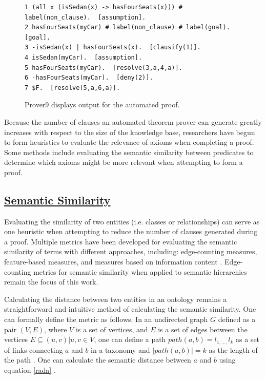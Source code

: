 \documentclass{article}
\begin{document}
\begin{figure}[h]
\begin{verbatim}
1 (all x (isSedan(x) -> hasFourSeats(x))) # label(non_clause).  [assumption].
2 hasFourSeats(myCar) # label(non_clause) # label(goal).  [goal].
3 -isSedan(x) | hasFourSeats(x).  [clausify(1)].
4 isSedan(myCar).  [assumption].
5 hasFourSeats(myCar).  [resolve(3,a,4,a)].
6 -hasFourSeats(myCar).  [deny(2)].
7 $F.  [resolve(5,a,6,a)].
\end{verbatim}
\caption[Prover9 Output]{Prover9 displays output for the automated proof. }
\label{fig:prover9out}
\end{figure}

Because the number of clauses an automated theorem prover can generate greatly increases with respect to the size of the knowledge base, researchers have begun to form heuristics to evaluate the relevance of axioms when completing a proof. Some methods include evaluating the semantic similarity between predicates to determine which axioms might be more relevant when attempting to form a proof. 

\subsection{\underline{Semantic Similarity}}
Evaluating the similarity of two entities (i.e. classes or relationships) can serve as one heuristic when attempting to reduce the number of clauses generated during a proof. Multiple metrics have been developed for evaluating the semantic similarity of terms with different approaches, including: edge-counting measures, feature-based measures, and measures based on information content \cite{sanchez2012ontology} \cite{rodriguez1999assessing} \cite{roederer2009divvy}.  Edge-counting metrics for semantic similarity when applied to semantic hierarchies remain the focus of this work. 

Calculating the distance between two entities in an ontology remains a straightforward and intuitive method of calculating the semantic similarity. One can formally define the metric as follows. In an undirected graph $G$ defined as a pair $(V,E)$, where $V$ is a set of vertices, and $E$ is a set of edges between the vertices $E \subseteq {(u,v) | u, v \in V}$, one can define a path $path(a,b)=l_{1,\dots ,}l_k$ as a set of links connecting $a$ and $b$ in a taxonomy and $\lvert path(a,b) \rvert = k$ as the length of the path \cite{sanchez2012ontology}. One can calculate the semantic distance between $a$ and $b$ using equation \ref{rada} \cite{rada1989development}.
\end{document}
